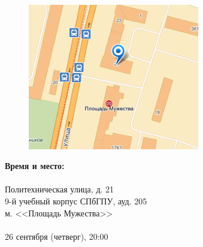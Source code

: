 \documentclass[12pt]{article}
\begin{document}
\begin{minipage}{0.5\textwidth}
\begin{figure}[H]
\includegraphics[width=7.5cm]{map.png} 
\end{figure}
\end{minipage} \hfill
\begin{minipage}{0.45\textwidth}
\textbf{Время и место:}\\
\\
Политехническая улица, д. 21\\
9-й учебный корпус СПбГПУ, ауд. 205\\
м. <<Площадь Мужества>>\\
\\
26 сентября (четверг), 20:00\\
\end{minipage}
\end{document}
